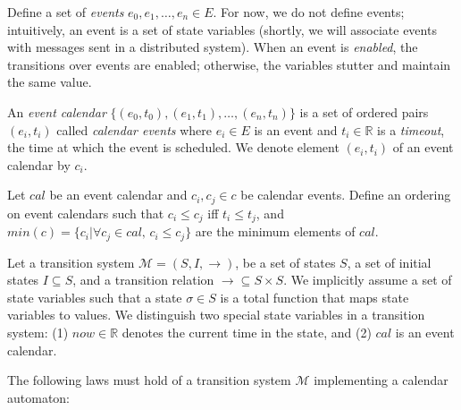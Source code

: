 \documentclass{llncs/llncs}
\begin{document}


Define a set of \emph{events} $e_0, e_1, \ldots, e_n \in E$. For now, we do not define events; intuitively, an event is a set of state variables (shortly, we will associate events with messages sent in a distributed system). When an event is \emph{enabled}, the transitions over events are enabled; otherwise, the variables stutter and maintain the same value.

An \emph{event calendar} $\{ (e_0, t_0), (e_1, t_1), \ldots, (e_n, t_n) \}$ is a set of ordered pairs $(e_i, t_i)$ called \emph{calendar events} where $e_i \in E$ is an event and $t_i \in \mathbb{R}$ is a \emph{timeout}, the time at which the event is scheduled. We denote element $(e_i, t_i)$ of an event calendar by $c_i$.

Let $cal$ be an event calendar and $c_i, c_j \in c$ be calendar events. Define an ordering on event calendars such that $c_i \leq c_j$ iff $t_i \leq t_j$, and $min(c) = \{ c_i | \forall c_j \in cal, \, c_i \leq c_j  \}$ are the minimum elements of $cal$.

Let a transition system $\mathcal{M} = (S, I, \rightarrow)$, be a set of states $S$, a set of initial states $I \subseteq S$, and a transition relation $\rightarrow \subseteq S \times S$. We implicitly assume a set of state variables such that a state $\sigma \in S$ is a total function that maps state variables to values. We distinguish two special state variables in a transition system: (1) $now \in \mathbb{R}$ denotes the current time in the state, and (2) $cal$ is an event calendar.

The following laws must hold of a transition system $\mathcal{M}$ implementing a calendar automaton:
\end{document}
